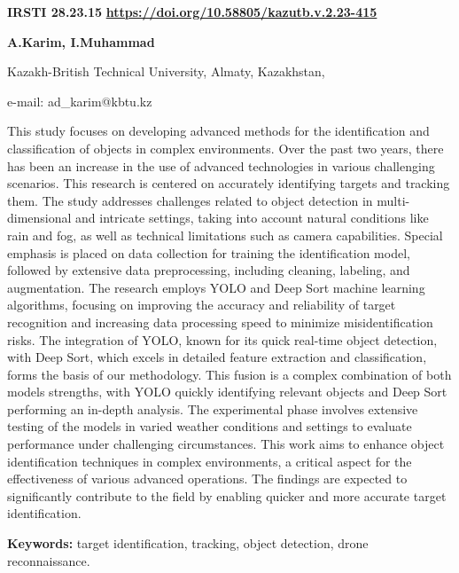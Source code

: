 \newpage
{\bfseries IRSTI 28.23.15}
\hfill {\bfseries \href{https://doi.org/10.58805/kazutb.v.2.23-415}{https://doi.org/10.58805/kazutb.v.2.23-415}}


\begin{center}
{\bfseries A.Karim\envelope, I.Muhammad}

Kazakh-British Technical University, Almaty, Kazakhstan,

e-mail: ad\_karim@kbtu.kz
\end{center}

This study focuses on developing advanced methods for the identification
and classification of objects in complex environments. Over the past two
years, there has been an increase in the use of advanced technologies in
various challenging scenarios. This research is centered on accurately
identifying targets and tracking them. The study addresses challenges
related to object detection in multi-dimensional and intricate settings,
taking into account natural conditions like rain and fog, as well as
technical limitations such as camera capabilities. Special emphasis is
placed on data collection for training the identification model,
followed by extensive data preprocessing, including cleaning, labeling,
and augmentation. The research employs YOLO and Deep Sort machine
learning algorithms, focusing on improving the accuracy and reliability
of target recognition and increasing data processing speed to minimize
misidentification risks. The integration of YOLO, known for its quick
real-time object detection, with Deep Sort, which excels in detailed
feature extraction and classification, forms the basis of our
methodology. This fusion is a complex combination of both
models\textquotesingle{} strengths, with YOLO quickly identifying
relevant objects and Deep Sort performing an in-depth analysis. The
experimental phase involves extensive testing of the models in varied
weather conditions and settings to evaluate performance under
challenging circumstances. This work aims to enhance object
identification techniques in complex environments, a critical aspect for
the effectiveness of various advanced operations. The findings are
expected to significantly contribute to the field by enabling quicker
and more accurate target identification.

{\bfseries Keywords:} target identification, tracking, object detection,
drone reconnaissance.

